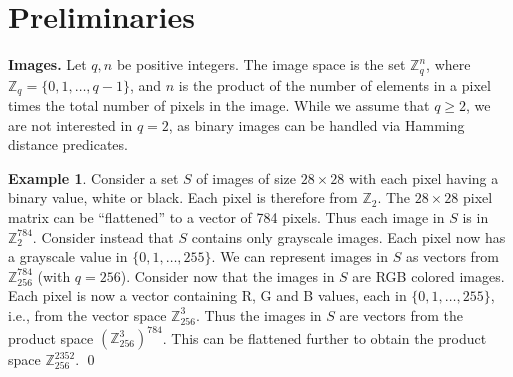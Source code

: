 \documentclass[pdflatex,sn-mathphys-num]{sn-jnl}
\newcommand{\descr}[1]{\vspace{0.2cm} \noindent \textbf{#1}}
\theoremstyle{definition}
\newtheorem{example}{Example}
\begin{document}

%
%
\section{Preliminaries}
\label{sec:pre}
\descr{Images.} 
Let $q, n$ be positive integers. The image space is the set $\mathbb{Z}_q^n$, where $\mathbb{Z}_q = \{0, 1, \ldots, q - 1\}$, and $n$ is the product of the number of elements in a pixel times the total number of pixels in the image. While we assume that $q \geq 2$, we are not interested in $q = 2$, as binary images can be handled via Hamming distance predicates. 

\begin{example}
\label{ex:images}
Consider a set $S$ of images of size $28 \times 28$ with each pixel having a binary value, white or black. Each pixel is therefore from $\mathbb{Z}_2$. The $28 \times 28$ pixel matrix can be ``flattened'' to a vector of 784 pixels. Thus each image in $S$ is in $\mathbb{Z}_2^{784}$. Consider instead that $S$ contains only grayscale images. Each pixel now has a grayscale value in $\{0, 1, \ldots, 255\}$. We can represent images in $S$ as vectors from $\mathbb{Z}_{256}^{784}$ (with $q = 256$). Consider now that the images in $S$ are RGB colored images. Each pixel is now a vector containing R, G and B values, each in $\{0, 1, \ldots, 255\}$, i.e., from the vector space $\mathbb{Z}_{256}^3$. Thus the images in $S$ are vectors from the product space $(\mathbb{Z}_{256}^{3})^{784}$. This can be flattened further to obtain the product space $\mathbb{Z}_{256}^{2352}$.
\qed
\end{example}
\end{document}
